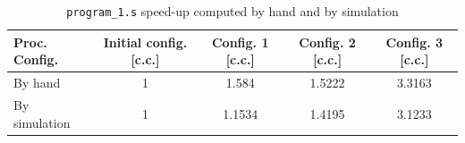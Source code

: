 \documentclass[11pt, a4paper]{article}
\begin{document}
\begin{table}[h]
\centering
\caption{\texttt{program\_1.s} speed-up computed by hand and by simulation}
\label{tab:speedup}
\begin{tabular}{|l|c|c|c|c|}
\hline
\textbf{Proc. Config.} & \textbf{Initial config. [c.c.]} & \textbf{Config. 1 [c.c.]} & \textbf{Config. 2 [c.c.]} & \textbf{Config. 3 [c.c.]} \\ \hline
By hand & 1 & 1.584 & 1.5222 & 3.3163 \\ \hline
By simulation & 1 & 1.1534 & 1.4195 & 3.1233 \\ \hline
\end{tabular}
\end{table}
\end{document}
